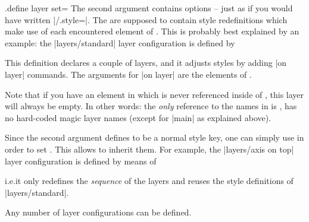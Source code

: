 \begin{handler}{{.define layer set}=}
    The second argument  contains options -- just as if
    you would have written |/.style=|. The
     are supposed to contain \PGFPlots{} style
    redefinitions which make use of each encountered element of . This is probably best explained by an example: the
    |layers/standard| layer configuration is defined by
\begin{codeexample}
\end{codeexample}
    \noindent This definition declares a couple of layers, and it adjusts
    \PGFPlots{} styles by adding |on layer| commands. The arguments for
    |on layer| are the elements of .

    Note that if you have an element in  which is
    never referenced inside of , this layer will always
    be empty. In other words: the \emph{only} reference to the names in
     is , \PGFPlots{} has no
    hard-coded magic layer names (except for |main| as explained above).

    Since the second argument  defines  to be
    a normal style key, one can simply use  in order to set
    . This allows to inherit them. For example, the
    |layers/axis on top| layer configuration is defined by means of
\begin{codeexample}
\end{codeexample}
    \noindent i.e.\@ it only redefines the \emph{sequence} of the layers and
    reuses the style definitions of |layers/standard|.

    Any number of layer configurations can be defined.
\end{handler}


